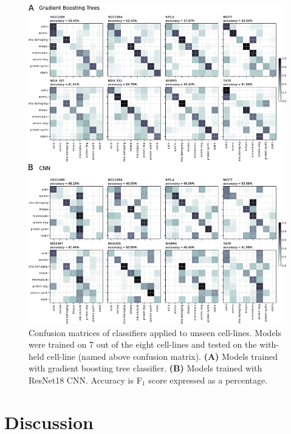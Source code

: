 \documentclass[a4paper,11pt,twoside,openright]{scrbook}
\begin{document}
\begin{figure}
    \includegraphics[width=1.1\textwidth]{ch2TransferLearning}
    \captionsetup{width=0.8\textwidth}
    \caption[Confusion matrices of classifiers when applied to unseen cell-lines]{
    Confusion matrices of classifiers applied to unseen cell-lines.
    Models were trained on 7 out of the eight cell-lines and tested on the with-held cell-line (named above confusion 
matrix).
    \textbf{(A)} Models trained with gradient boosting tree classifier.
    \textbf{(B)} Models trained with ResNet18 CNN.
    Accuracy is F$_1$ score expressed as a percentage.
    }
    \label{figure:transfer_learning}
\end{figure}



\section{Discussion}
\end{document}
